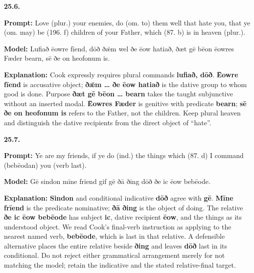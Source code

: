 \par\begin{minipage}{\linewidth}\raggedright
\textbf{25.6.}

\textbf{Prompt:} Love (plur.) your enemies, do (om. to) them well that hate you, that ye (om. may) be (196. f) children of your Father, which (87. b) is in heaven (plur.).

\textbf{Model:} Lufiað ēowre fīend, dōð ðǣm wel ðe ēow hatiað, ðæt gē bēon ēowres Fæder bearn, sē ðe on heofonum is.

\textbf{Explanation:} Cook expressly requires plural commands \textbf{lufiað, dōð}. \textbf{Ēowre fīend} is accusative object; \textbf{ðǣm … ðe ēow hatiað} is the dative group to whom good is done. Purpose \textbf{ðæt gē bēon … bearn} takes the taught subjunctive without an inserted modal. \textbf{Ēowres Fæder} is genitive with predicate \textbf{bearn}; \textbf{sē ðe on heofonum is} refers to the Father, not the children. Keep plural heaven and distinguish the dative recipients from the direct object of “hate”.

\end{minipage}\par\addvspace{4pt}

\par\begin{minipage}{\linewidth}\raggedright
\textbf{25.7.}

\textbf{Prompt:} Ye are my friends, if ye do (ind.) the things which (87. d) I command (bebēodan) you (verb last).

\textbf{Model:} Gē sindon mīne frīend gif gē ðā ðing dōð ðe ic ēow bebēode.

\textbf{Explanation:} \textbf{Sindon} and conditional indicative \textbf{dōð} agree with \textbf{gē}. \textbf{Mīne frīend} is the predicate nominative; \textbf{ðā ðing} is the object of doing. The relative \textbf{ðe ic ēow bebēode} has subject \textbf{ic}, dative recipient \textbf{ēow}, and the things as its understood object. We read Cook’s final-verb instruction as applying to the nearest named verb, \textbf{bebēode}, which is last in that relative. A defensible alternative places the entire relative beside \textbf{ðing} and leaves \textbf{dōð} last in its conditional. Do not reject either grammatical arrangement merely for not matching the model; retain the indicative and the stated relative-final target.

\end{minipage}\par\addvspace{4pt}

